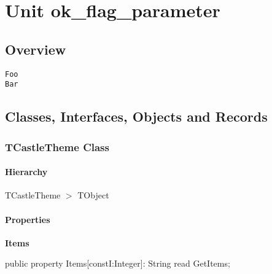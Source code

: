 \documentclass{report}
\newif\ifpdf
\begin{document}
\label{toc}\tableofcontents
\newpage
\newlength{\tmplength}
\chapter{Unit ok{\_}flag{\_}parameter}
\label{ok_flag_parameter}
\section{Overview}
\begin{description}
\item[\texttt{\begin{ttfamily}TCastleTheme\end{ttfamily} Class}]
\end{description}
\begin{description}
\item[\texttt{Foo}]
\item[\texttt{Bar}]
\end{description}
\section{Classes, Interfaces, Objects and Records}
\ifpdf
\subsection*{\large{\textbf{TCastleTheme Class}}\normalsize\hspace{1ex}\hrulefill}
\else
\subsection*{TCastleTheme Class}
\fi
\label{ok_flag_parameter.TCastleTheme}
\subsubsection*{\large{\textbf{Hierarchy}}\normalsize\hspace{1ex}\hfill}
TCastleTheme {$>$} TObject
\subsubsection*{\large{\textbf{Properties}}\normalsize\hspace{1ex}\hfill}
\begin{list}{}{
\setlength{\itemindent}{0cm}
\setlength{\listparindent}{0cm}
\setlength{\leftmargin}{\evensidemargin}
\addtolength{\leftmargin}{\tmplength}
\settowidth{\labelsep}{X}
\addtolength{\leftmargin}{\labelsep}
\setlength{\labelwidth}{\tmplength}
}
\label{ok_flag_parameter.TCastleTheme-Items}
\item[\textbf{Items}\hfill]
\ifpdf
\begin{flushleft}
\fi
\begin{ttfamily}
public property Items[constI:Integer]: String read GetItems;\end{ttfamily}

\ifpdf
\end{flushleft}
\fi


\par  \end{list}
\end{document}
